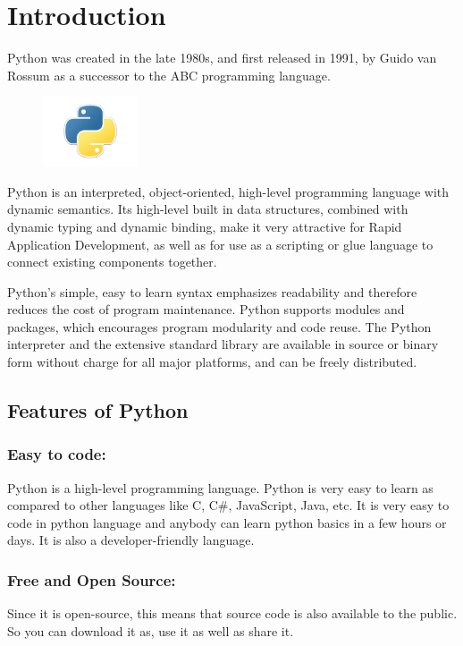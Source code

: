 \documentclass[12pt, a4paper]{report}
\begin{document}
  \section{Introduction}
  Python was created in the late 1980s, and first released in 1991, by Guido van Rossum as a successor to the ABC programming language.
  \begin{figure}
    \includegraphics[width=0.25\textwidth]{introduction}
  \end{figure}
  Python is an interpreted, object-oriented, high-level programming language with dynamic semantics. Its high-level built in data structures, combined with dynamic typing and dynamic binding, make it very attractive for Rapid Application Development, as well as for use as a scripting or glue language to connect existing components together.

  Python's simple, easy to learn syntax emphasizes readability and therefore reduces the cost of program maintenance. Python supports modules and packages, which encourages program modularity and code reuse. The Python interpreter and the extensive standard library are available in source or binary form without charge for all major platforms, and can be freely distributed.
  
  \subsection{Features of Python}
    \subsubsection{Easy to code:}
    Python is a high-level programming language. Python is very easy to learn as compared to other languages like C, C#, JavaScript, Java, etc. It is very easy to code in python language and anybody can learn python basics in a few hours or days. It is also a developer-friendly language.
    
    \subsubsection{Free and Open Source:}
    Since it is open-source, this means that source code is also available to the public. So you can download it as, use it as well as share it.
    
\end{document}
